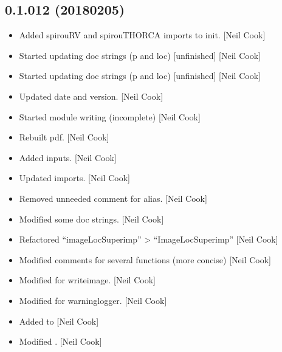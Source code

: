 \documentclass[a4paper,10pt,english]{report}
\begin{document}
\subsection{0.1.012 (2018\sphinxhyphen{}02\sphinxhyphen{}05)}
\label{\detokenize{misc/changelog:id511}}\begin{itemize}
\item {} 
Added spirouRV and spirouTHORCA imports to init. {[}Neil Cook{]}

\item {} 
Started updating doc strings (p and loc) {[}unfinished{]} {[}Neil Cook{]}

\item {} 
Started updating doc strings (p and loc) {[}unfinished{]} {[}Neil Cook{]}

\item {} 
Updated date and version. {[}Neil Cook{]}

\item {} 
Started module writing (incomplete) {[}Neil Cook{]}

\item {} 
Rebuilt pdf. {[}Neil Cook{]}

\item {} 
Added inputs. {[}Neil Cook{]}

\item {} 
Updated imports. {[}Neil Cook{]}

\item {} 
Removed unneeded comment for alias. {[}Neil Cook{]}

\item {} 
Modified some doc strings. {[}Neil Cook{]}

\item {} 
Refactored “imageLocSuperimp” \textendash{}\textgreater{} “ImageLocSuperimp” {[}Neil Cook{]}

\item {} 
Modified comments for several functions (more concise) {[}Neil Cook{]}

\item {} 
Modified  for writeimage. {[}Neil Cook{]}

\item {} 
Modified  for warninglogger. {[}Neil Cook{]}

\item {} 
Added to  {[}Neil Cook{]}

\item {} 
Modified  . {[}Neil Cook{]}


\end{itemize}
\end{document}
